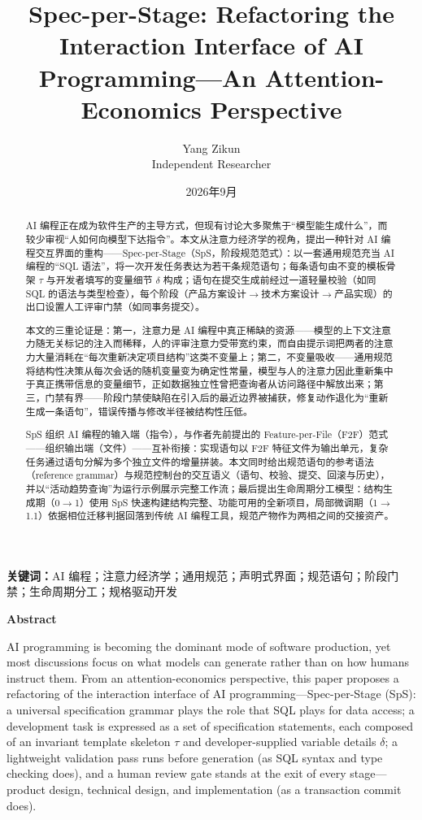 \documentclass[11pt,a4paper]{ctexart}
\title{Spec-per-Stage: Refactoring the Interaction Interface of AI Programming---An Attention-Economics Perspective}
\author{Yang Zikun\\Independent Researcher}
\date{2026年9月}
\begin{document}
\maketitle

\clearpage

\tableofcontents

\clearpage


\begin{abstract}
AI 编程正在成为软件生产的主导方式，但现有讨论大多聚焦于“模型能生成什么”，而较少审视“人如何向模型下达指令”。本文从注意力经济学的视角，提出一种针对 AI 编程交互界面的重构——Spec-per-Stage（SpS，阶段规范范式）：以一套通用规范充当 AI 编程的“SQL 语法”，将一次开发任务表达为若干条规范语句；每条语句由不变的模板骨架 $\tau$ 与开发者填写的变量细节 $\delta$ 构成；语句在提交生成前经过一道轻量校验（如同 SQL 的语法与类型检查），每个阶段（产品方案设计$\rightarrow$技术方案设计$\rightarrow$产品实现）的出口设置人工评审门禁（如同事务提交）。

本文的三重论证是：第一，注意力是 AI 编程中真正稀缺的资源——模型的上下文注意力随无关标记的注入而稀释，人的评审注意力受带宽约束，而自由提示词把两者的注意力大量消耗在“每次重新决定项目结构”这类不变量上；第二，不变量吸收——通用规范将结构性决策从每次会话的随机变量变为确定性常量，模型与人的注意力因此重新集中于真正携带信息的变量细节，正如数据独立性曾把查询者从访问路径中解放出来；第三，门禁有界——阶段门禁使缺陷在引入后的最近边界被捕获，修复动作退化为“重新生成一条语句”，错误传播与修改半径被结构性压低。

SpS 组织 AI 编程的输入端（指令），与作者先前提出的 Feature-per-File（F2F）范式——组织输出端（文件）——互补衔接：实现语句以 F2F 特征文件为输出单元，复杂任务通过语句分解为多个独立文件的增量拼装。本文同时给出规范语句的参考语法（reference grammar）与规范控制台的交互语义（语句、校验、提交、回滚与历史），并以“活动趋势查询”为运行示例展示完整工作流；最后提出生命周期分工模型：结构生成期（0$\to$1）使用 SpS 快速构建结构完整、功能可用的全新项目，局部微调期（1$\to$1.1）依据相位迁移判据回落到传统 AI 编程工具，规范产物作为两相之间的交接资产。
\end{abstract}

\noindent\textbf{关键词：}AI 编程；注意力经济学；通用规范；声明式界面；规范语句；阶段门禁；生命周期分工；规格驱动开发

\begin{center}
\textbf{Abstract}
\end{center}
\noindent AI programming is becoming the dominant mode of software production, yet most discussions focus on what models can generate rather than on how humans instruct them. From an attention-economics perspective, this paper proposes a refactoring of the interaction interface of AI programming---Spec-per-Stage (SpS): a universal specification grammar plays the role that SQL plays for data access; a development task is expressed as a set of specification statements, each composed of an invariant template skeleton $\tau$ and developer-supplied variable details $\delta$; a lightweight validation pass runs before generation (as SQL syntax and type checking does), and a human review gate stands at the exit of every stage---product design, technical design, and implementation (as a transaction commit does).
\end{document}
